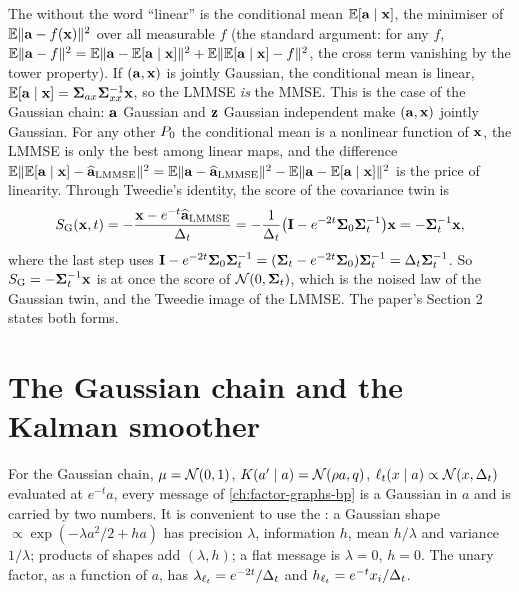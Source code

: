 The  without the word ``linear'' is the conditional
mean $\mathbb{E}[\mathbf{a}\mid\mathbf{x}]$, the minimiser of $\mathbb{E}\lVert\mathbf{a}-f(\mathbf{x})\rVert^2$ over all measurable
$f$ (the standard argument: for any $f$, $\mathbb{E}\lVert\mathbf{a}-f\rVert^2=\mathbb{E}\lVert\mathbf{a}-\mathbb{E}[\mathbf{a}\mid\mathbf{x}]\rVert^2+\mathbb{E}\lVert\mathbb{E}[\mathbf{a}\mid\mathbf{x}]-f\rVert^2$,
the cross term vanishing by the tower property). If $(\mathbf{a},\mathbf{x})$ is jointly Gaussian,
the conditional mean is linear, $\mathbb{E}[\mathbf{a}\mid\mathbf{x}]=\mathbf{\Sigma}_{ax}\mathbf{\Sigma}_{xx}^{-1}\mathbf{x}$, so the LMMSE
\emph{is} the MMSE. This is the case of the Gaussian chain: $\mathbf{a}$ Gaussian and $\mathbf{z}$
Gaussian independent make $(\mathbf{a},\mathbf{x})$ jointly Gaussian. For any other $P_0$ the
conditional mean is a nonlinear function of $\mathbf{x}$, the LMMSE is only the best among
linear maps, and the difference
$\mathbb{E}\lVert\mathbb{E}[\mathbf{a}\mid\mathbf{x}]-\widehat{\mathbf{a}}_{\mathrm{LMMSE}}\rVert^2=\mathbb{E}\lVert\mathbf{a}-\widehat{\mathbf{a}}_{\mathrm{LMMSE}}\rVert^2-\mathbb{E}\lVert\mathbf{a}-\mathbb{E}[\mathbf{a}\mid\mathbf{x}]\rVert^2$
is the price of linearity. Through Tweedie's identity, the score of the covariance
twin is
\begin{equation}
  S_{\mathrm{G}}(\mathbf{x},t)=-\frac{\mathbf{x}-e^{-t}\widehat{\mathbf{a}}_{\mathrm{LMMSE}}}{\Delta_t}
  =-\frac{1}{\Delta_t}\bigl(\mathbf{I}-e^{-2t}\mathbf{\Sigma}_0\mathbf{\Sigma}_t^{-1}\bigr)\mathbf{x}=-\mathbf{\Sigma}_t^{-1}\mathbf{x},
  \label{eq:gc-score-twin}
\end{equation}
where the last step uses $\mathbf{I}-e^{-2t}\mathbf{\Sigma}_0\mathbf{\Sigma}_t^{-1}=(\mathbf{\Sigma}_t-e^{-2t}\mathbf{\Sigma}_0)\mathbf{\Sigma}_t^{-1}=\Delta_t\mathbf{\Sigma}_t^{-1}$.
So $S_{\mathrm{G}}=-\mathbf{\Sigma}_t^{-1}\mathbf{x}$ is at once the score of $\mathcal{N}\!\left(0,\mathbf{\Sigma}_t\right)$, which is the
noised law of the Gaussian twin, and the Tweedie image of the LMMSE. The paper's
Section 2 states both forms.

\section{The Gaussian chain and the Kalman smoother}
\label{sec:gc-kalman}

For the Gaussian chain, $\mu=\mathcal{N}\!\left(0,1\right)$, $K(a'\mid a)=\mathcal{N}\!\left(\rho a,q\right)$,
$\ell_t(x\mid a)\propto\mathcal{N}\!\left(x,\Delta_t\right)$ evaluated at $e^{-t}a$, every message of
\cref{ch:factor-graphs-bp} is a Gaussian in $a$ and is carried by two numbers. It is
convenient to use the : a Gaussian shape $\propto\exp(-\lambda a^2/2+ha)$
has precision $\lambda$, information $h$, mean $h/\lambda$ and variance $1/\lambda$;
products of shapes add $(\lambda,h)$; a flat message is $\lambda=0$, $h=0$. The unary
factor, as a function of $a$, has $\lambda_{\ell_t}=e^{-2t}/\Delta_t$ and
$h_{\ell_t}=e^{-t}x_i/\Delta_t$.

